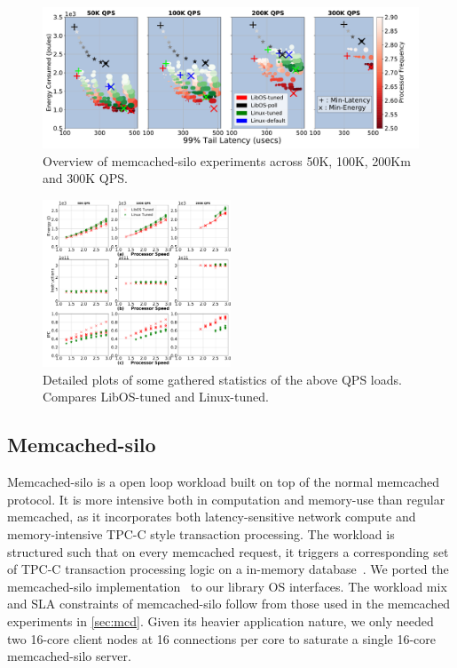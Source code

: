 \begin{figure}
\centering
\includegraphics[width=1\textwidth]{figures/mcdsilo_overview}
\vspace*{-8mm}
\caption[]
{Overview of memcached-silo experiments across 50K, 100K, 200Km and 300K QPS.}
\label{fig:mcdsilo_overview}
\end{figure}

\begin{figure}
\includegraphics[width=0.5\textwidth]{figures/mcdsilo_detail}
\vspace*{-8mm}
\caption[]{Detailed plots of some gathered statistics of the above QPS loads. Compares LibOS-tuned and Linux-tuned.}
\label{fig:mcdsilo_detail}
\end{figure}

\subsection{Memcached-silo}
\label{sec:mcdsilo}
Memcached-silo is a open loop workload built on top of the normal memcached protocol. It is more intensive both in computation and memory-use than regular memcached, as it incorporates both latency-sensitive network compute and memory-intensive TPC-C style transaction processing. The workload is structured such that on every memcached request, it triggers a corresponding set of TPC-C transaction processing logic on a in-memory database~\cite{silo}. We ported the memcached-silo implementation~\cite{mcdsilo, zygos} to our library OS interfaces. The workload mix and SLA constraints of memcached-silo follow from those used in the memcached experiments in \cref{sec:mcd}. Given its heavier application nature, we only needed two 16-core client nodes at 16 connections per core to saturate a single 16-core memcached-silo server. 

